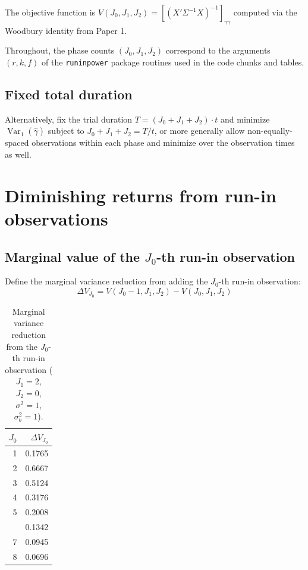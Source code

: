 \documentclass[
  11pt,
]{article}
\begin{document}
The objective function is
\(V(J_0, J_1, J_2) = [(X'\Sigma^{-1}X)^{-1}]_{\gamma\gamma}\)
computed via the Woodbury identity from Paper 1.

Throughout, the phase counts \((J_0, J_1, J_2)\) correspond
to the arguments \((r, k, f)\) of the \texttt{runinpower} package
routines used in the code chunks and tables.

\subsection{Fixed total duration}\label{fixed-total-duration}

Alternatively, fix the trial duration
\(T = (J_0 + J_1 + J_2) \cdot t\) and minimize
\(\mathop{\mathrm{Var}}_1(\hat\gamma)\) subject to
\(J_0 + J_1 + J_2 = T/t\), or more generally allow
non-equally-spaced observations within each phase
and minimize over the observation times as well.

\section{Diminishing returns from run-in observations}\label{diminishing-returns-from-run-in-observations}

\subsection{\texorpdfstring{Marginal value of the \(J_0\)-th run-in observation}{Marginal value of the J\_0-th run-in observation}}\label{marginal-value-of-the-j_0-th-run-in-observation}

Define the marginal variance reduction from adding
the \(J_0\)-th run-in observation:
\begin{equation}
  \Delta V_{J_0} = V(J_0 - 1, J_1, J_2) - V(J_0, J_1, J_2)
\end{equation}

\begin{table}

\caption{\label{tab:marginal-value}Marginal variance reduction from the $J_0$-th run-in observation ($J_1=2$, $J_2=0$, $\sigma^2 = 1$, $\sigma_b^2 = 1$).}
\centering
\begin{tabular}[t]{rr}
\toprule
$J_0$ & $\Delta V_{J_0}$\\
\midrule
1 & 0.1765\\
2 & 0.6667\\
3 & 0.5124\\
4 & 0.3176\\
5 & 0.2008\\
\addlinespace
6 & 0.1342\\
7 & 0.0945\\
8 & 0.0696\\
\bottomrule
\end{tabular}
\end{table}
\end{document}
